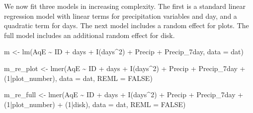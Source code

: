 \documentclass[
  ignorenonframetext,
]{beamer}
\newenvironment{Shaded}{\begin{snugshade}}{\end{snugshade}}
\newcommand{\AttributeTok}[1]{\textcolor[rgb]{0.77,0.63,0.00}{#1}}
\newcommand{\ConstantTok}[1]{\textcolor[rgb]{0.00,0.00,0.00}{#1}}
\newcommand{\DecValTok}[1]{\textcolor[rgb]{0.00,0.00,0.81}{#1}}
\newcommand{\FunctionTok}[1]{\textcolor[rgb]{0.00,0.00,0.00}{#1}}
\newcommand{\NormalTok}[1]{#1}
\newcommand{\OtherTok}[1]{\textcolor[rgb]{0.56,0.35,0.01}{#1}}
\newcommand{\SpecialCharTok}[1]{\textcolor[rgb]{0.00,0.00,0.00}{#1}}
\begin{document}
\begin{frame}[fragile]{}
\protect\hypertarget{section-14}{}
We now fit three models in increasing complexity. The first is a
standard linear regression model with linear terms for precipitation
variables and day, and a quadratic term for days. The next model
includes a random effect for plots. The full model includes an
additional random effect for disk.

\vspace{12pt}
\tiny

\begin{Shaded}
\begin{Highlighting}[]
\NormalTok{m }\OtherTok{\textless{}{-}} \FunctionTok{lm}\NormalTok{(AqE }\SpecialCharTok{\textasciitilde{}}\NormalTok{ ID }\SpecialCharTok{+}\NormalTok{ days }\SpecialCharTok{+} \FunctionTok{I}\NormalTok{(days}\SpecialCharTok{\^{}}\DecValTok{2}\NormalTok{) }\SpecialCharTok{+}\NormalTok{ Precip }\SpecialCharTok{+}\NormalTok{ Precip\_7day, }
  \AttributeTok{data =}\NormalTok{ dat)}

\NormalTok{m\_re\_plot }\OtherTok{\textless{}{-}} \FunctionTok{lmer}\NormalTok{(AqE }\SpecialCharTok{\textasciitilde{}}\NormalTok{ ID }\SpecialCharTok{+}\NormalTok{ days }\SpecialCharTok{+} \FunctionTok{I}\NormalTok{(days}\SpecialCharTok{\^{}}\DecValTok{2}\NormalTok{) }\SpecialCharTok{+}\NormalTok{ Precip }\SpecialCharTok{+} 
\NormalTok{  Precip\_7day }\SpecialCharTok{+}\NormalTok{ (}\DecValTok{1}\SpecialCharTok{|}\NormalTok{plot\_number), }\AttributeTok{data =}\NormalTok{ dat, }\AttributeTok{REML =} \ConstantTok{FALSE}\NormalTok{)}

\NormalTok{m\_re\_full }\OtherTok{\textless{}{-}} \FunctionTok{lmer}\NormalTok{(AqE }\SpecialCharTok{\textasciitilde{}}\NormalTok{ ID }\SpecialCharTok{+}\NormalTok{ days }\SpecialCharTok{+} \FunctionTok{I}\NormalTok{(days}\SpecialCharTok{\^{}}\DecValTok{2}\NormalTok{) }\SpecialCharTok{+}\NormalTok{ Precip }\SpecialCharTok{+} 
\NormalTok{  Precip\_7day }\SpecialCharTok{+}\NormalTok{ (}\DecValTok{1}\SpecialCharTok{|}\NormalTok{plot\_number) }\SpecialCharTok{+}\NormalTok{ (}\DecValTok{1}\SpecialCharTok{|}\NormalTok{disk), }\AttributeTok{data =}\NormalTok{ dat, }\AttributeTok{REML =} \ConstantTok{FALSE}\NormalTok{)}
\end{Highlighting}
\end{Shaded}
\end{frame}
\end{document}
